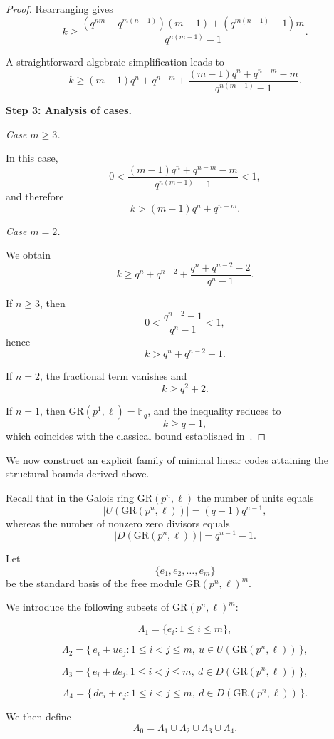 \documentclass[10pt]{article}
\theoremstyle{definition}
\begin{document}
\begin{proof}
Rearranging gives
\[
k
\ge
\frac{(q^{nm} - q^{m(n-1)})(m-1)
+
(q^{m(n-1)} - 1)m}
{q^{n(m-1)} - 1}.
\]

A straightforward algebraic simplification leads to
\[
k
\ge
(m-1)q^{n}
+
q^{n-m}
+
\frac{(m-1)q^{n} + q^{n-m} - m}
{q^{n(m-1)} - 1}.
\]

\medskip
\noindent
\textbf{Step 3: Analysis of cases.}

\emph{Case \( m \ge 3 \).}

In this case,
\[
0
<
\frac{(m-1)q^{n} + q^{n-m} - m}
{q^{n(m-1)} - 1}
< 1,
\]
and therefore
\[
k > (m-1)q^{n} + q^{n-m}.
\]

\medskip
\noindent
\emph{Case \( m = 2 \).}

We obtain
\[
k
\ge
q^{n} + q^{n-2}
+
\frac{q^{n} + q^{n-2} - 2}{q^{n} - 1}.
\]

If \( n \ge 3 \), then
\[
0 <
\frac{q^{n-2} - 1}{q^{n} - 1}
< 1,
\]
hence
\[
k > q^{n} + q^{n-2} + 1.
\]

If \( n = 2 \), the fractional term vanishes and
\[
k \ge q^{2} + 2.
\]

If \( n = 1 \), then $\mathrm{GR}(p^{1},\ell)=\mathbb{F}_q$, and the inequality reduces to
\[
k \ge q + 1,
\]
which coincides with the classical bound established in~\cite{WeiXiaXiwang}.
\end{proof}

We now construct an explicit family of minimal linear codes attaining the structural bounds derived above.

Recall that in the Galois ring $\mathrm{GR}(p^{n},\ell)$ the number of units equals
\[
|U(\mathrm{GR}(p^{n},\ell))|=(q-1)q^{n-1},
\]
whereas the number of nonzero zero divisors equals
\[
|D(\mathrm{GR}(p^{n},\ell))|=q^{n-1}-1.
\]

Let
\[
\{e_1,e_2,\dots,e_m\}
\]
be the standard basis of the free module
\(
\mathrm{GR}(p^{n},\ell)^{m}.
\)

We introduce the following subsets of $\mathrm{GR}(p^{n},\ell)^{m}$:

\[
\Lambda_1=\{e_i : 1\le i\le m\},
\]

\[
\Lambda_2=
\{\, e_i + u e_j
: 1\le i<j\le m,\ u\in U(\mathrm{GR}(p^{n},\ell)) \,\},
\]

\[
\Lambda_3=
\{\, e_i + d e_j
: 1\le i<j\le m,\ d\in D(\mathrm{GR}(p^{n},\ell)) \,\},
\]

\[
\Lambda_4=
\{\, d e_i + e_j
: 1\le i<j\le m,\ d\in D(\mathrm{GR}(p^{n},\ell)) \,\}.
\]

We then define
\[
\Lambda_0
=
\Lambda_1
\cup
\Lambda_2
\cup
\Lambda_3
\cup
\Lambda_4.
\]
\end{document}
